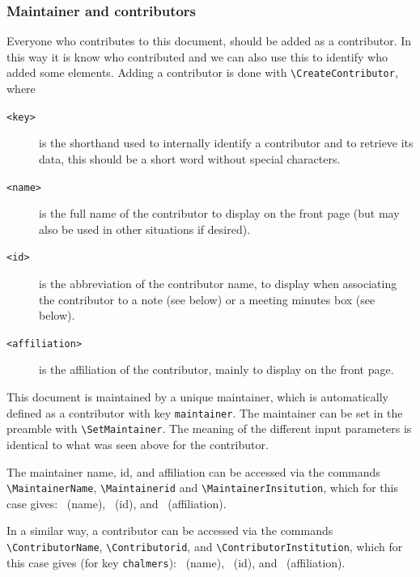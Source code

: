 \documentclass{project-logbook}
\begin{document}
		\subsubsection{Maintainer and contributors}
			Everyone who contributes to this document, should be added as a contributor. In this way it is know who contributed and we can also use this to identify who added some elements. Adding a contributor is done with \texttt{\textbackslash CreateContributor}, where
			\begin{description}
				\item[\texttt{<key>}] is the shorthand used to internally identify a contributor and to retrieve its data, this should be a short word without special characters.
				\item[\texttt{<name>}] is the full name of the contributor to display on the front page (but may also be used in other situations if desired).
				\item[\texttt{<id>}] is the abbreviation of the contributor name, to display when associating the contributor to a note (see below) or a meeting minutes box (see below).
				\item[\texttt{<affiliation>}] is the affiliation of the contributor, mainly to display on the front page.
    			\end{description}

			This document is maintained by a unique maintainer, which is automatically defined as a contributor with key \texttt{maintainer}. The maintainer can be set in the preamble with  \texttt{\textbackslash SetMaintainer}. The meaning of the different input parameters is identical to what was seen above for the contributor.

			The maintainer name, id, and affiliation can be accessed via the commands \texttt{\textbackslash MaintainerName}, \texttt{\textbackslash Maintainerid} and \texttt{\textbackslash MaintainerInsitution}, which for this case gives: \MaintainerName~(name), \Maintainerid~(id), and \MaintainerInstitution~(affiliation).

			In a similar way, a contributor can be accessed via the commands \texttt{\textbackslash ContributorName}, \texttt{\textbackslash Contributorid}, and \texttt{\textbackslash ContributorInstitution}, which for this case gives (for key \texttt{chalmers}):  ~(name), ~(id), and ~(affiliation).
\end{document}

